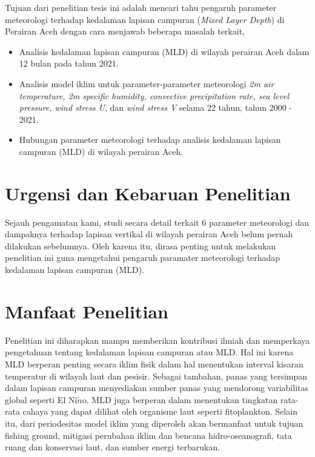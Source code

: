 \begin{spacing}{1.5}
	Tujuan dari penelitian tesis ini adalah mencari tahu pengaruh parameter meteorologi terhadap kedalaman lapisan campuran (\textit{Mixed Layer Depth}) di Perairan Aceh dengan cara menjawab beberapa masalah terkait,
	
	\begin{itemize}
		\item Analisis kedalaman lapisan campuran (MLD) di wilayah perairan Aceh dalam 12 bulan pada tahun 2021.
		\item Analisis model iklim untuk parameter-parameter meteorologi \textit{2m air temperature, 2m specific humidity, convective precipitation rate, sea level pressure, wind stress U}, dan \textit{wind stress V} selama 22 tahun, tahun 2000 - 2021.
		\item Hubungan parameter meteorologi terhadap analisis kedalaman lapisan campuran (MLD) di wilayah perairan Aceh.
	\end{itemize}
	
	\section[Urgensi dan Kebaruan Penelitian]{Urgensi dan Kebaruan Penelitian}

	Sejauh pengamatan kami, studi secara detail terkait 6 parameter meteorologi dan dampaknya terhadap lapisan vertikal di wilayah perairan Aceh belum pernah dilakukan sebelumnya. Oleh karena itu, dirasa penting untuk melakukan penelitian ini guna mengetahui pengaruh paramater meteorologi terhadap kedalaman lapisan campuran (MLD).

	\section[Manfaat Penelitian]{Manfaat Penelitian}
	
	Penelitian ini diharapkan mampu memberikan kontribusi ilmiah dan memperkaya pengetahuan tentang kedalaman lapisan campuran atau MLD. Hal ini karena MLD berperan penting secara iklim fisik dalam hal menentukan interval kisaran temperatur di wilayah laut dan pesisir. Sebagai tambahan, panas yang tersimpan dalam lapisan campuran menyediakan sumber panas yang mendorong variabilitas global seperti El Ni$\tilde{n}$o. MLD juga berperan dalam menentukan tingkatan rata-rata cahaya yang dapat dilihat oleh organisme laut seperti fitoplankton. Selain itu, dari periodesitas model iklim yang diperoleh akan bermanfaat untuk tujuan fishing ground, mitigasi perubahan iklim dan bencana hidro-oseanografi, tata ruang dan konservasi
	laut, dan sumber energi terbarukan. 


\end{spacing}
